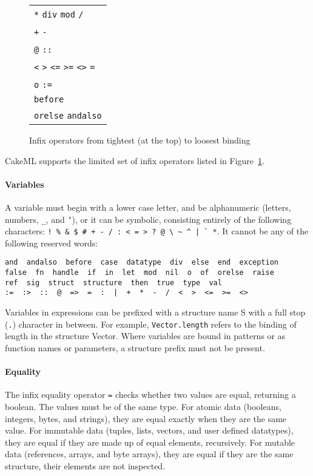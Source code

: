 \documentclass[12pt,a4paper]{book}
\begin{document}
\begin{figure}
\centering
\begin{tabular}{l}
 \texttt{*} \texttt{div} \texttt{mod} \texttt{/}\\
 \texttt{+} \texttt{-}\\
 \texttt{@} \texttt{::}\\
 \texttt{<} \texttt{>} \texttt{<=} \texttt{>=} \texttt{<>} \texttt{=}\\
 \texttt{o} \texttt{:=}\\
 \texttt{before}\\
 \texttt{orelse} \texttt{andalso}
 \end{tabular}
\caption{Infix operators from tightest (at the top) to loosest binding}
\label{precedences}
\end{figure}

CakeML supports the limited set of infix operators listed in Figure~\ref{precedences}.


\paragraph{Variables}

A variable must begin with a lower case letter, and be alphanumeric (letters, numbers, \texttt{\_}, and \texttt{'}), or it can be symbolic, consisting entirely of the following characters: \verb)! % & $ # + - / : < = > ? @ \ ~ ^ | ` *). It cannot be any of the following reserved words:
\begin{verbatim}
and  andalso  before  case  datatype  div  else  end  exception
false  fn  handle  if  in  let  mod  nil  o  of  orelse  raise
ref  sig  struct  structure  then  true  type  val
:=  :>  ::  @  =>  =  :  |  +  *  -  /  <  >  <=  >=  <>
\end{verbatim}

Variables in expressions can be prefixed with a structure name S with a full stop (\texttt{.}) character in between. For example, \texttt{Vector.length} refers to the binding of length in the structure Vector. Where variables are bound in patterns or as function names or parameters, a structure prefix must not be present.

\paragraph{Equality}

The infix equality operator \texttt{=} checks whether two values are equal, returning a boolean. The values must be of the same type. For atomic data (booleans, integers, bytes, and strings), they are equal exactly when they are the same value. For immutable data (tuples, lists, vectors, and user defined datatypes), they are equal if they are made up of equal elements, recursively. For mutable data (references, arrays, and byte arrays), they are equal if they are the same structure, their elements are not inspected.
\end{document}
